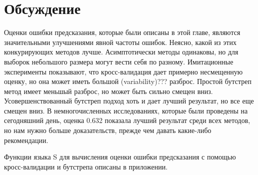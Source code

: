 \section{Обсуждение}
Оценки ошибки предсказания, которые были описаны в этой главе, являются значительными улучшениями явной частоты ошибок. Неясно, какой из этих конкурирующих методов лучше. Асимптотически методы одинаковы, но для выборок небольшого размера могут вести себя по разному. Имитационные эксперименты показывают, что кросс-валидация дает примерно несмещенную оценку, но она может иметь большой (variability)??? разброс. Простой бутстреп метод имеет меньшый разброс, но может быть сильно смещен вниз. Усовершенствованный бутстреп подход хоть и дает лучший результат, но все еще смещен вниз. В немногочисленных исследованиях, которые были проведены на сегодняшний день, оценка 0.632 показала лучший результат среди всех методов, но нам нужно больше доказательств, прежде чем давать какие-либо рекомендации.

Функции языка S для вычисления оценки ошибки предсказания с помощью кросс-валидации и бутстрепа описаны в приложении.